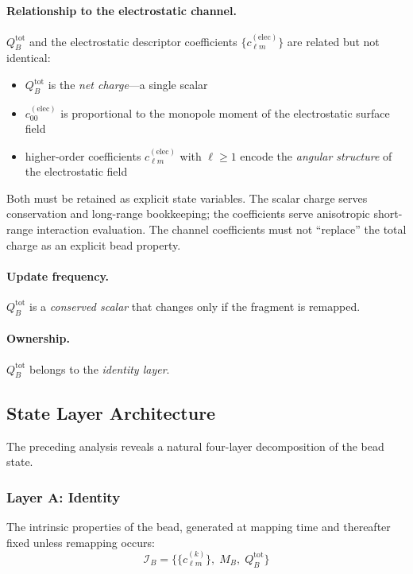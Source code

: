 \documentclass[11pt]{article}
\begin{document}
\paragraph{Relationship to the electrostatic channel.}
$Q_B^{\mathrm{tot}}$ and the electrostatic descriptor coefficients
$\{c_{\ell m}^{(\mathrm{elec})}\}$ are related but not identical:
\begin{itemize}
    \item $Q_B^{\mathrm{tot}}$ is the \emph{net charge}---a single scalar
    \item $c_{00}^{(\mathrm{elec})}$ is proportional to the monopole moment
          of the electrostatic surface field
    \item higher-order coefficients $c_{\ell m}^{(\mathrm{elec})}$ with
          $\ell \geq 1$ encode the \emph{angular structure} of the
          electrostatic field
\end{itemize}
Both must be retained as explicit state variables.  The scalar charge serves
conservation and long-range bookkeeping; the coefficients serve anisotropic
short-range interaction evaluation.  The channel coefficients must not
``replace'' the total charge as an explicit bead property.

\paragraph{Update frequency.}
$Q_B^{\mathrm{tot}}$ is a \emph{conserved scalar} that changes only if
the fragment is remapped.

\paragraph{Ownership.}
$Q_B^{\mathrm{tot}}$ belongs to the \emph{identity layer}.

\subsection{State Layer Architecture}

The preceding analysis reveals a natural four-layer decomposition of the
bead state.

\subsubsection{Layer A: Identity}

The intrinsic properties of the bead, generated at mapping time and
thereafter fixed unless remapping occurs:
\begin{equation}
    \mathcal{I}_B = \bigl\{ \{c_{\ell m}^{(k)}\},\; M_B,\; Q_B^{\mathrm{tot}} \bigr\}
\end{equation}
\end{document}
